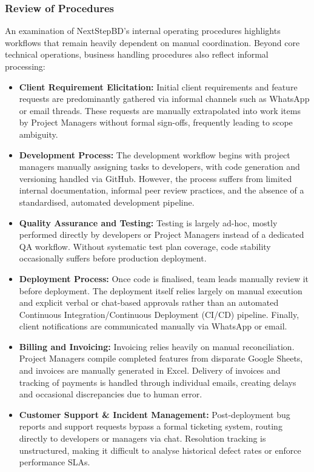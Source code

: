 \documentclass[12pt,a4paper]{report}
\begin{document}
\subsubsection{Review of Procedures}
An examination of NextStepBD's internal operating procedures highlights workflows that remain heavily dependent on manual coordination. Beyond core technical operations, business handling procedures also reflect informal processing:

\begin{itemize}[leftmargin=2em]
    \item \textbf{Client Requirement Elicitation:} Initial client requirements and feature requests are predominantly gathered via informal channels such as WhatsApp or email threads. These requests are manually extrapolated into work items by Project Managers without formal sign-offs, frequently leading to scope ambiguity.
    \item \textbf{Development Process:} The development workflow begins with project managers manually assigning tasks to developers, with code generation and versioning handled via GitHub. However, the process suffers from limited internal documentation, informal peer review practices, and the absence of a standardised, automated development pipeline.
    \item \textbf{Quality Assurance and Testing:} Testing is largely ad-hoc, mostly performed directly by developers or Project Managers instead of a dedicated QA workflow. Without systematic test plan coverage, code stability occasionally suffers before production deployment.
    \item \textbf{Deployment Process:} Once code is finalised, team leads manually review it before deployment. The deployment itself relies largely on manual execution and explicit verbal or chat-based approvals rather than an automated Continuous Integration/Continuous Deployment (CI/CD) pipeline. Finally, client notifications are communicated manually via WhatsApp or email.
    \item \textbf{Billing and Invoicing:} Invoicing relies heavily on manual reconciliation. Project Managers compile completed features from disparate Google Sheets, and invoices are manually generated in Excel. Delivery of invoices and tracking of payments is handled through individual emails, creating delays and occasional discrepancies due to human error.
    \item \textbf{Customer Support \& Incident Management:} Post-deployment bug reports and support requests bypass a formal ticketing system, routing directly to developers or managers via chat. Resolution tracking is unstructured, making it difficult to analyse historical defect rates or enforce performance SLAs.
\end{itemize}
\end{document}
